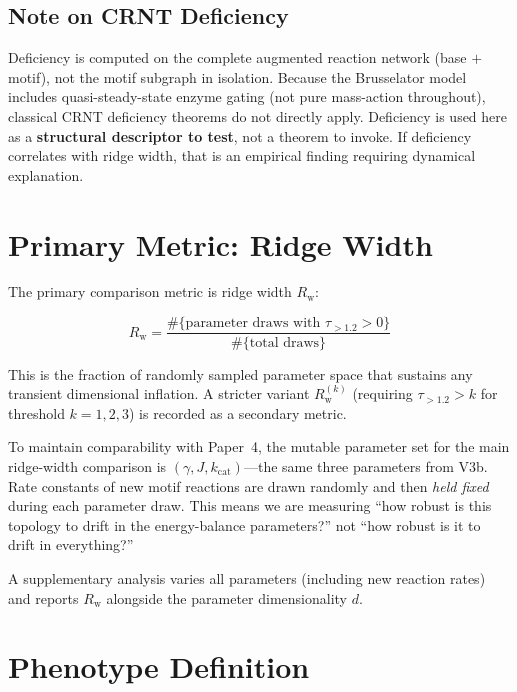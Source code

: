 \documentclass[aps,prl,twocolumn,superscriptaddress,floatfix]{revtex4-2}
\newcommand{\tauexp}{\tau_{>1.2}}
\newcommand{\kcat}{k_{\mathrm{cat}}}
\newcommand{\Rw}{R_{\mathrm{w}}}
\begin{document}
\subsection{Note on CRNT Deficiency}
\label{sec:crnt_note}

Deficiency is computed on the complete augmented reaction network
(base $+$ motif), not the motif subgraph in isolation.  Because
the Brusselator model includes quasi-steady-state enzyme gating
(not pure mass-action throughout), classical CRNT deficiency
theorems do not directly apply.  Deficiency is used here as a
\textbf{structural descriptor to test}, not a theorem to invoke.
If deficiency correlates with ridge width, that is an empirical
finding requiring dynamical explanation.

\section{Primary Metric: Ridge Width}
\label{sec:ridge_width}

The primary comparison metric is ridge width $\Rw$:

\begin{equation}
\Rw = \frac{\#\{\text{parameter draws with } \tauexp > 0\}}
           {\#\{\text{total draws}\}}
\end{equation}

This is the fraction of randomly sampled parameter space that
sustains any transient dimensional inflation.  A stricter variant
$\Rw^{(k)}$ (requiring $\tauexp > k$ for threshold $k = 1, 2, 3$)
is recorded as a secondary metric.

To maintain comparability with Paper~4, the mutable parameter set
for the main ridge-width comparison is $(\gamma, J, \kcat)$---the
same three parameters from V3b.  Rate constants of new motif
reactions are drawn randomly and then \emph{held fixed} during
each parameter draw.  This means we are measuring ``how robust
is this topology to drift in the energy-balance parameters?''
not ``how robust is it to drift in everything?''

A supplementary analysis varies all parameters (including new
reaction rates) and reports $\Rw$ alongside the parameter
dimensionality $d$.

\section{Phenotype Definition}
\end{document}

